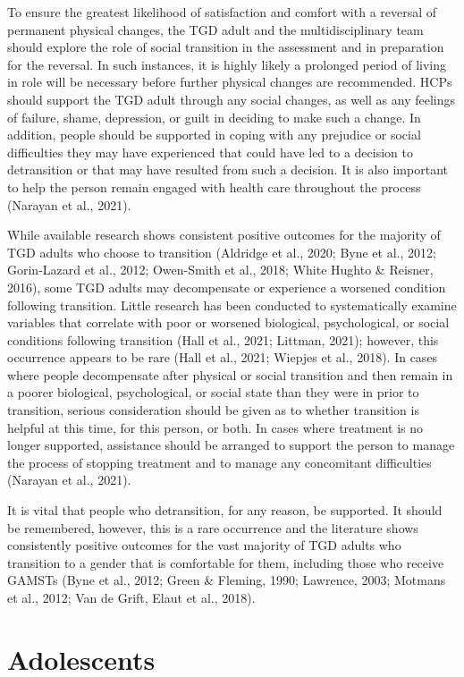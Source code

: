 \documentclass[
]{book}
\begin{document}
To ensure the greatest likelihood of satisfaction
and comfort with a reversal of permanent physical changes, the TGD adult and the multidisciplinary team should explore the role of social
transition in the assessment and in preparation
for the reversal. In such instances, it is highly
likely a prolonged period of living in role will
be necessary before further physical changes are
recommended. HCPs should support the TGD
adult through any social changes, as well as any
feelings of failure, shame, depression, or guilt in
deciding to make such a change. In addition,
people should be supported in coping with any
prejudice or social difficulties they may have
experienced that could have led to a decision to
detransition or that may have resulted from such
a decision. It is also important to help the person
remain engaged with health care throughout the
process (Narayan et al., 2021).

While available research shows consistent positive outcomes for the majority of TGD adults
who choose to transition (Aldridge et al., 2020;
Byne et al., 2012; Gorin-Lazard et al., 2012;
Owen-Smith et al., 2018; White Hughto \&
Reisner, 2016), some TGD adults may decompensate or experience a worsened condition following transition. Little research has been
conducted to systematically examine variables
that correlate with poor or worsened biological,
psychological, or social conditions following
transition (Hall et al., 2021; Littman, 2021);
however, this occurrence appears to be rare
(Hall et al., 2021; Wiepjes et al., 2018). In cases
where people decompensate after physical or
social transition and then remain in a poorer
biological, psychological, or social state than
they were in prior to transition, serious consideration should be given as to whether transition
is helpful at this time, for this person, or both.
In cases where treatment is no longer supported,
assistance should be arranged to support the
person to manage the process of stopping treatment and to manage any concomitant difficulties
(Narayan et al., 2021).

It is vital that people who detransition, for
any reason, be supported. It should be remembered, however, this is a rare occurrence and
the literature shows consistently positive outcomes for the vast majority of TGD adults who
transition to a gender that is comfortable for
them, including those who receive GAMSTs
(Byne et al., 2012; Green \& Fleming, 1990;
Lawrence, 2003; Motmans et al., 2012; Van de
Grift, Elaut et al., 2018).

\hypertarget{adolescents}{%
\chapter{Adolescents}\label{adolescents}}
\end{document}
